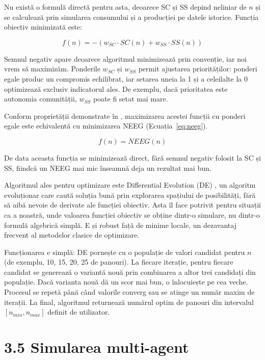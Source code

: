 \documentclass[12pt,a4paper]{report}
\begin{document}
Nu există o formulă directă pentru asta, deoarece SC și SS depind neliniar de $n$ și se calculează prin simularea consumului și a producției pe datele istorice. Funcția obiectiv minimizată este:

\begin{equation}
  f(n) = -(w_{SC} \cdot SC(n) + w_{SS} \cdot SS(n))
  \label{eq:obj}
\end{equation}

Semnul negativ apare deoarece algoritmul minimizează prin convenție, iar noi vrem să maximizăm. Ponderile $w_{SC}$ și $w_{SS}$ permit ajustarea priorităților: ponderi egale produc un compromis echilibrat, iar setarea uneia la 1 și a celeilalte la 0 optimizează exclusiv indicatorul ales. De exemplu, dacă prioritatea este autonomia comunității, $w_{SS}$ poate fi setat mai mare.

Conform proprietății demonstrate în \cite{simoiu2021jcp}, maximizarea acestei funcții cu ponderi egale este echivalentă cu minimizarea NEEG (Ecuația~\ref{eq:neeg}).

\begin{equation}
  f(n) = NEEG(n)
  \label{eq:obj_neeg}
\end{equation}

De data aceasta funcția se minimizează direct, fără semnul negativ folosit la SC și SS, fiindcă un NEEG mai mic înseamnă deja un rezultat mai bun.

Algoritmul ales pentru optimizare este Differential Evolution (DE) \cite{stornprice1997}, un algoritm evoluționar care caută soluția bună prin explorarea spațiului de posibilități, fără să aibă nevoie de derivate ale funcției obiectiv. Asta îl face potrivit pentru situații ca a noastră, unde valoarea funcției obiectiv se obține dintr-o simulare, nu dintr-o formulă algebrică simplă. E și robust față de minime locale, un dezavantaj frecvent al metodelor clasice de optimizare.

Funcționarea e simplă: DE pornește cu o populație de valori candidat pentru $n$ (de exemplu, 10, 15, 20, 25 de panouri). La fiecare iterație, pentru fiecare candidat se generează o variantă nouă prin combinarea a altor trei candidați din populație. Dacă varianta nouă dă un scor mai bun, o înlocuiește pe cea veche. Procesul se repetă până când valorile converg sau se atinge un număr maxim de iterații. La final, algoritmul returnează numărul optim de panouri din intervalul $[n_{min}, n_{max}]$ definit de utilizator.

\section*{3.5 Simularea multi-agent}
\end{document}
